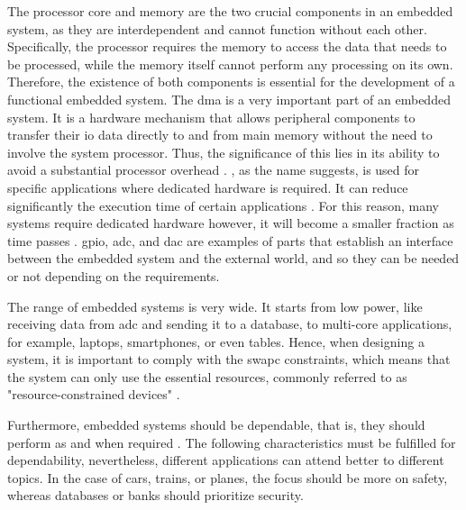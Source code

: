 The processor core and memory are the two crucial components in an embedded system, as they are interdependent and cannot function without each 
other. Specifically, the processor requires the memory to access the data that needs to be processed, while the memory itself cannot perform any 
processing on its own. Therefore, the existence of both components is essential for the development of a functional embedded system. The \gls{dma} 
is a very important part of an embedded system. It is a hardware mechanism that allows peripheral components to transfer their \gls{io} data 
directly to and from main memory without the need to involve the system processor. Thus, the significance of this lies in its ability to avoid 
a substantial processor overhead \cite{LinuxDeviceDrivers}. , as the name suggests, is used for specific applications where 
dedicated hardware is required. It can reduce significantly the execution time of certain applications \cite{FPGAaccelaration3} 
\cite{FPGAaccelaration2} \cite{FPGAaccelaration}. For this reason, many systems require dedicated hardware however, it will become a smaller 
fraction as time passes \cite{camposano1996embedded}. \gls{gpio}, \gls{adc}, and \gls{dac} are examples of parts that establish an interface 
between the embedded system and the external world, and so they can be needed or not depending on the requirements.

The range of embedded systems is very wide. It starts from low power, like receiving data from \gls{adc} and sending it to a database, to 
multi-core applications, for example, laptops, smartphones, or even tables. Hence, when designing a system, it is important to comply with 
the \gls{swapc} constraints, which means that the system can only use the essential resources, commonly referred to as "resource-constrained 
devices" \cite{swapc}. 

Furthermore, embedded systems should be dependable, that is, they should perform as and when required \cite{iec}. The following characteristics 
must be fulfilled for dependability, nevertheless, different applications can attend better to different topics. In the case of cars, trains, 
or planes, the focus should be more on safety, whereas databases or banks should prioritize security.

